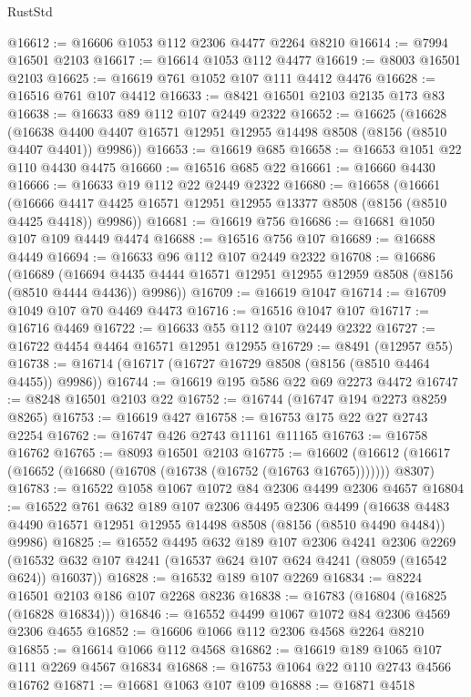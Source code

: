\begin{lexlean}{RustStd}
\begin{coremodule}
@16612 := @16606 @1053 @112 @2306 @4477 @2264 @8210
@16614 := @7994 @16501 @2103
@16617 := @16614 @1053 @112 @4477
@16619 := @8003 @16501 @2103
@16625 := @16619 @761 @1052 @107 @111 @4412 @4476
@16628 := @16516 @761 @107 @4412
@16633 := @8421 @16501 @2103 @2135 @173 @83
@16638 := @16633 @89 @112 @107 @2449 @2322
@16652 := @16625
    (@16628
      (@16638 @4400 @4407 @16571 @12951 @12955 @14498 @8508 (@8156 (@8510 @4407 @4401)) @9986))
@16653 := @16619 @685
@16658 := @16653 @1051 @22 @110 @4430 @4475
@16660 := @16516 @685 @22
@16661 := @16660 @4430
@16666 := @16633 @19 @112 @22 @2449 @2322
@16680 := @16658
    (@16661
      (@16666 @4417 @4425 @16571 @12951 @12955 @13377 @8508 (@8156 (@8510 @4425 @4418)) @9986))
@16681 := @16619 @756
@16686 := @16681 @1050 @107 @109 @4449 @4474
@16688 := @16516 @756 @107
@16689 := @16688 @4449
@16694 := @16633 @96 @112 @107 @2449 @2322
@16708 := @16686
    (@16689
      (@16694 @4435 @4444 @16571 @12951 @12955 @12959 @8508 (@8156 (@8510 @4444 @4436)) @9986))
@16709 := @16619 @1047
@16714 := @16709 @1049 @107 @70 @4469 @4473
@16716 := @16516 @1047 @107
@16717 := @16716 @4469
@16722 := @16633 @55 @112 @107 @2449 @2322
@16727 := @16722 @4454 @4464 @16571 @12951 @12955
@16729 := @8491 (@12957 @55)
@16738 := @16714 (@16717 (@16727 @16729 @8508 (@8156 (@8510 @4464 @4455)) @9986))
@16744 := @16619 @195 @586 @22 @69 @2273 @4472
@16747 := @8248 @16501 @2103 @22
@16752 := @16744 (@16747 @194 @2273 @8259 @8265)
@16753 := @16619 @427
@16758 := @16753 @175 @22 @27 @2743 @2254
@16762 := @16747 @426 @2743 @11161 @11165
@16763 := @16758 @16762
@16765 := @8093 @16501 @2103
@16775 := @16602
    (@16612 (@16617 (@16652 (@16680 (@16708 (@16738 (@16752 (@16763 @16765))))))) @8307)
@16783 := @16522 @1058 @1067 @1072 @84 @2306 @4499 @2306 @4657
@16804 := @16522
    @761
    @632
    @189
    @107
    @2306
    @4495
    @2306
    @4499
    (@16638 @4483 @4490 @16571 @12951 @12955 @14498 @8508 (@8156 (@8510 @4490 @4484)) @9986)
@16825 := @16552
    @4495
    @632
    @189
    @107
    @2306
    @4241
    @2306
    @2269
    (@16532 @632 @107 @4241 (@16537 @624 @107 @624 @4241 (@8059 (@16542 @624)) @16037))
@16828 := @16532 @189 @107 @2269
@16834 := @8224 @16501 @2103 @186 @107 @2268 @8236
@16838 := @16783 (@16804 (@16825 (@16828 @16834)))
@16846 := @16552 @4499 @1067 @1072 @84 @2306 @4569 @2306 @4655
@16852 := @16606 @1066 @112 @2306 @4568 @2264 @8210
@16855 := @16614 @1066 @112 @4568
@16862 := @16619 @189 @1065 @107 @111 @2269 @4567 @16834
@16868 := @16753 @1064 @22 @110 @2743 @4566 @16762
@16871 := @16681 @1063 @107 @109
@16888 := @16871
    @4518

\end{coremodule}
\end{lexlean}
